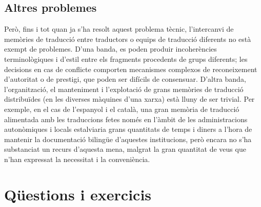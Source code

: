 \subsection{Altres problemes}
Però, fins i tot quan ja s'ha resolt aquest problema tècnic,
l'intercanvi de memòries de traducció entre traductors o equips de
traducció diferents no està exempt de problemes. D'una banda, es poden
produir incoherències terminològiques i d'estil entre els fragments
procedents de grups diferents; les decisions en cas de conflicte
comporten mecanismes complexos de reconeixement d'autoritat o de
prestigi, que poden ser difícils de consensuar. D'altra banda,
l'organització, el manteniment i l'explotació de grans memòries de
traducció distribuïdes (en les diverses màquines d'una xarxa) està
lluny de ser trivial. Per exemple, en el cas de l'espanyol i el
català, una gran memòria de traducció alimentada amb les traduccions
fetes només en l'àmbit de les administracions autonòmiques i locals
estalviaria grans quantitats de temps i diners a l'hora de mantenir la
documentació bilingüe d'aquestes institucions, però encara no s'ha
substanciat un recurs d'aquesta mena, malgrat la gran quantitat de
veus que n'han expressat la necessitat i la conveniència.

\section{Qüestions i exercicis}

